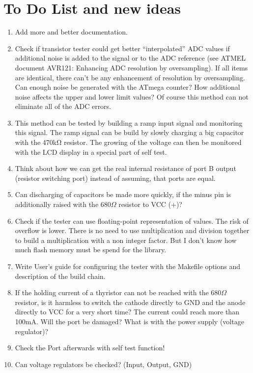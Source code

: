 
\chapter{To Do List and new ideas}
\label{sec:todo}

\begin{enumerate}
\item Add more and better documentation.
\item Check if transistor tester could get better “interpolated” ADC values if additional noise is added to the signal or to the ADC reference (see ATMEL document AVR121: Enhancing ADC resolution by oversampling).
If all items are identical, there can't be any enhancement of resolution by oversampling. Can enough noise be generated with the ATmega counter?
How additional noise affects  the upper and lower limit values?
Of course this method can not eliminate all of the ADC errors. 
\item This method can be tested by building a ramp input signal and monitoring this signal.
The ramp signal can be build by slowly charging a big capacitor with the 470kΩ resistor.
The growing of the voltage can then be monitored with the LCD display in a special part of self test.
\item Think about how we can get the real internal resistance of port B output (resistor switching port) instead of assuming, that ports are equal.
\item Can discharging of capacitors be made more quickly, if the minus pin is additionally raised
with the \(680\Omega\) resistor to VCC (+)?
\item Check if the tester can use floating-point representation of  values. The risk of overflow  is lower.
There is no need to use multiplication and division together to build a multiplication with a non integer factor.
But I don't know how much flash memory must be spend for the library.
\item Write User's guide for configuring the tester with the Makefile options and description of the build chain.
\item If the holding current of a thyristor can not be reached with the \(680\Omega\) resistor, is it harmless to switch the cathode directly to GND
and the anode directly to VCC for a very short time?
The current could reach more than 100mA. Will the port be damaged? What is with the power supply (voltage regulator)?
\item Check the Port afterwards with self test function!
\item Can voltage regulators be checked? (Input, Output, GND)

\end{enumerate}
